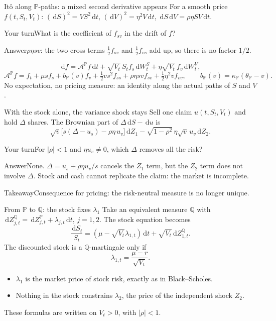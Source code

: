 \documentclass[handout,10pt,t,aspectratio=169]{beamer}
\newenvironment{pausebox}{\begin{block}{Your turn}}{\end{block}}
\newenvironment{answerbox}{\begin{exampleblock}{Answer}}{\end{exampleblock}}
\newenvironment{keybox}{\begin{exampleblock}{Takeaway}}{\end{exampleblock}}
\newcommand{\Q}{\mathbb Q}
\newcommand{\Pp}{\mathbb P}
\newcommand{\dd}{\,\mathrm d}
\begin{document}
\begin{frame}{It\^o along \(\Pp\)-paths: a mixed second derivative appears}
\small
For a smooth price \(f(t,S_t,V_t)\): \((\dd S)^2=VS^2\dd t\), \((\dd V)^2=\eta^2V\dd t\),
\(\dd S\dd V=\rho\eta SV\dd t\).
\begin{pausebox}What is the coefficient of \(f_{sv}\) in the drift of \(f\)?\end{pausebox}
\begin{answerbox}\(\rho\eta sv\): the two cross terms \(\tfrac12f_{sv}\) and
\(\tfrac12f_{vs}\) add up, so there is no factor \(1/2\).\end{answerbox}
\[
\dd f=\mathcal A^\Pp f\dd t+\sqrt{V_t}\,S_tf_s\dd W_t^S+\eta\sqrt{V_t}\,f_v\dd W_t^V,
\]
\[
\mathcal A^\Pp f=f_t+\mu sf_s+b_\Pp(v)f_v
+\tfrac12vs^2f_{ss}+\rho\eta svf_{sv}+\tfrac12\eta^2vf_{vv},
\qquad b_\Pp(v)=\kappa_\Pp(\theta_\Pp-v).
\]
No expectation, no pricing measure: an identity along the actual paths of \(S\) and \(V\).
\end{frame}

\begin{frame}{With the stock alone, the variance shock stays}
\small
Sell one claim \(u(t,S_t,V_t)\) and hold \(\Delta\) shares. The Brownian part of
\(\Delta\dd S-\dd u\) is
\[
\sqrt v\bigl[s(\Delta-u_s)-\rho\eta\,u_v\bigr]\dd Z_1
-\sqrt{1-\rho^2}\,\eta\sqrt v\,u_v\dd Z_2.
\]
\begin{pausebox}For \(|\rho|<1\) and \(\eta u_v\ne0\), which \(\Delta\) removes all the risk?\end{pausebox}
\begin{answerbox}None. \(\Delta=u_s+\rho\eta u_v/s\) cancels the \(Z_1\) term, but the
\(Z_2\) term does not involve \(\Delta\). Stock and cash cannot replicate the claim:
the market is incomplete.\end{answerbox}
\begin{keybox}Consequence for pricing: the risk-neutral measure is no longer unique.\end{keybox}
\end{frame}

\begin{frame}{From \(\Pp\) to \(\Q\): the stock fixes \(\lambda_1\)}
\small
Take an equivalent measure \(\Q\) with \(\dd Z_{j,t}^\Q=\dd Z_{j,t}^\Pp+\lambda_{j,t}\dd t\),
\(j=1,2\). The stock equation becomes
\[
\frac{\dd S_t}{S_t}=(\mu-\sqrt{V_t}\lambda_{1,t})\dd t
+\sqrt{V_t}\dd Z_{1,t}^\Q.
\]
The discounted stock is a \(\Q\)-martingale only if
\[
\boxed{\lambda_{1,t}=\frac{\mu-r}{\sqrt{V_t}}.}
\]
\begin{itemize}
\item \(\lambda_1\) is the market price of stock risk, exactly as in Black--Scholes.
\item Nothing in the stock constrains \(\lambda_2\), the price of the independent shock \(Z_2\).
\end{itemize}
These formulas are written on \(V_t>0\), with \(|\rho|<1\).
\end{frame}
\end{document}
